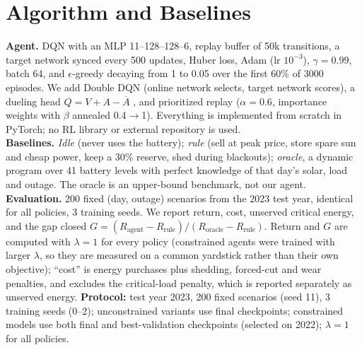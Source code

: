 ﻿\documentclass[10pt,twocolumn]{article}
\begin{document}
\section{Algorithm and Baselines}
\textbf{Agent.} DQN \cite{dqn} with an MLP 11--128--128--6, replay buffer of 50k transitions, a target network synced every 500 updates, Huber loss, Adam (lr $10^{-3}$), $\gamma{=}0.99$, batch 64, and $\epsilon$-greedy decaying from 1 to 0.05 over the first 60\% of 3000 episodes. We add Double DQN \cite{ddqn} (online network selects, target network scores), a dueling head $Q=V+A-\overline{A}$ \cite{duel}, and prioritized replay \cite{per} ($\alpha{=}0.6$, importance weights with $\beta$ annealed 0.4$\to$1). Everything is implemented from scratch in PyTorch; no RL library or external repository is used.\\
\textbf{Baselines.} \emph{Idle} (never uses the battery); \emph{rule} (sell at peak price, store spare sun and cheap power, keep a 30\% reserve, shed during blackouts); \emph{oracle}, a dynamic program over 41 battery levels with perfect knowledge of that day's solar, load and outage. The oracle is an upper-bound benchmark, not our agent.\\
\textbf{Evaluation.} 200 fixed (day, outage) scenarios from the 2023 test year, identical for all policies, 3 training seeds. We report return, cost, unserved critical energy, and the gap closed $G=(R_{\text{agent}}-R_{\text{rule}})/(R_{\text{oracle}}-R_{\text{rule}})$. Return and $G$ are computed with $\lambda{=}1$ for every policy (constrained agents were trained with larger $\lambda$, so they are measured on a common yardstick rather than their own objective); ``cost'' is energy purchases plus shedding, forced-cut and wear penalties, and excludes the critical-load penalty, which is reported separately as unserved energy. \textbf{Protocol:} test year 2023, 200 fixed scenarios (seed 11), 3 training seeds (0--2); unconstrained variants use final checkpoints; constrained models use both final and best-validation checkpoints (selected on 2022); $\lambda{=}1$ for all policies.
\end{document}
